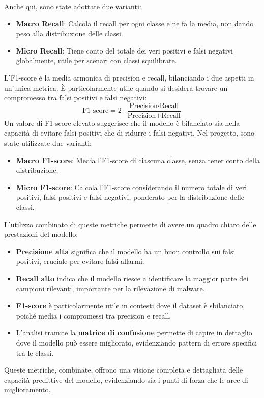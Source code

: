 Anche qui, sono state adottate due varianti:
\begin{itemize}
    \item \textbf{Macro Recall}: Calcola il recall per ogni classe e ne fa la media, non dando peso alla distribuzione delle classi.
    \item \textbf{Micro Recall}: Tiene conto del totale dei veri positivi e falsi negativi globalmente, utile per scenari con classi squilibrate.
\end{itemize}

L'F1-score è la media armonica di precision e recall, bilanciando i due aspetti in un'unica metrica. È particolarmente utile quando si desidera trovare un compromesso tra falsi positivi e falsi negativi:
\[
\text{F1-score} = 2 \cdot \frac{\text{Precision} \cdot \text{Recall}}{\text{Precision} + \text{Recall}}
\]
Un valore di F1-score elevato suggerisce che il modello è bilanciato sia nella capacità di evitare falsi positivi che di ridurre i falsi negativi. Nel progetto, sono state utilizzate due varianti:
\begin{itemize}
    \item \textbf{Macro F1-score}: Media l'F1-score di ciascuna classe, senza tener conto della distribuzione.
    \item \textbf{Micro F1-score}: Calcola l'F1-score considerando il numero totale di veri positivi, falsi positivi e falsi negativi, ponderato per la distribuzione delle classi.
\end{itemize}

L'utilizzo combinato di queste metriche permette di avere un quadro chiaro delle prestazioni del modello:
\begin{itemize}
    \item \textbf{Precisione alta} significa che il modello ha un buon controllo sui falsi positivi, cruciale per evitare falsi allarmi.
    \item \textbf{Recall alto} indica che il modello riesce a identificare la maggior parte dei campioni rilevanti, importante per la rilevazione di malware.
    \item \textbf{F1-score} è particolarmente utile in contesti dove il dataset è sbilanciato, poiché media i compromessi tra precision e recall.
    \item L'analisi tramite la \textbf{matrice di confusione} permette di capire in dettaglio dove il modello può essere migliorato, evidenziando pattern di errore specifici tra le classi.
\end{itemize}
Queste metriche, combinate, offrono una visione completa e dettagliata delle capacità predittive del modello, evidenziando sia i punti di forza che le aree di miglioramento.

